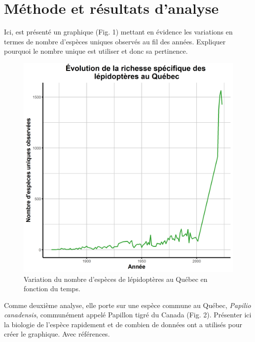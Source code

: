 \documentclass[9pt,twocolumn,twoside,]{pnas-new}
\begin{document}
\section{Méthode et résultats
d'analyse}\label{muxe9thode-et-ruxe9sultats-danalyse}

Ici, est présenté un graphique (Fig. 1) mettant en évidence les
variations en termes de nombre d'espèces uniques observés au fil des
années. Expliquer pourquoi le nombre unique est utiliser et donc sa
pertinence.

\begin{figure}
\includegraphics[width=0.9\linewidth]{../Figures_analyse/graphique_biodiversite} \caption{Variation du nombre d'espèces de lépidoptères au Québec en fonction du temps.}\label{fig:fig_graphique_biodiversite}
\end{figure}

Comme deuxième analyse, elle porte sur une espèce commune au Québec,
\emph{Papilio canadensis}, communément appelé Papillon tigré du Canada
(Fig. 2). Présenter ici la biologie de l'espèce rapidement et de combien
de données ont a utilisés pour créer le graphique. Avec références.
\end{document}
